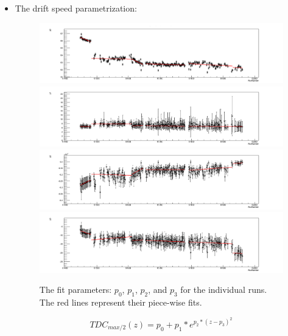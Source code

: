 \begin{itemize}
~\newpage
\item The drift speed parametrization:
\begin{figure}[!h]
\centering
\includegraphics[scale=0.28]{fig_rtpc/p0_RunNumber.png}
\includegraphics[scale=0.28]{fig_rtpc/p1_RunNumber.png}
\includegraphics[scale=0.28]{fig_rtpc/p2_RunNumber.png}
\includegraphics[scale=0.28]{fig_rtpc/p3_RunNumber.png}
\caption{ The fit parameters: $p_{0}$, $p_{1}$, $p_{2}$, and $p_{3}$ for the individual runs. The red lines represent their piece-wise fits. }
\label{fig:Drift_speed_fit_par}
\end{figure} 


\begin{equation}
TDC_{max/2} (z)= p_{0} +  p_{1} * e^{p_{2}*(z-p_{3})^{2}}
\end{equation}


\end{itemize}
